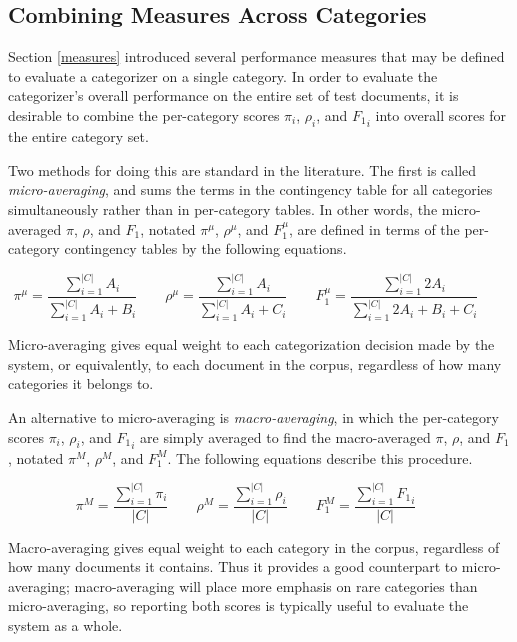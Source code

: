 \subsection{Combining Measures Across Categories}
\label{combining-measures}

Section \ref{measures} introduced several performance measures that
may be defined to evaluate a categorizer on a single category.  In
order to evaluate the categorizer's overall performance on the entire
set of test documents, it is desirable to combine the per-category
scores $\pi_i$, $\rho_i$, and ${F_1}_i$ into overall scores for the
entire category set.

Two methods for doing this are standard in the literature.  The first
is called \emph{micro-averaging}, and sums the terms in the
contingency table for all categories simultaneously rather than in
per-category tables.  In other words, the micro-averaged $\pi$,
$\rho$, and $F_1$, notated $\pi^\mu$, $\rho^\mu$, and $F^\mu_1$, are
defined in terms of the per-category contingency tables by the
following equations.

\begin{equation*}
 \pi^\mu = \frac{\sum_{i=1}^{|C|}{A_i}} {\sum_{i=1}^{|C|}{A_i+B_i}} \qquad
\rho^\mu = \frac{\sum_{i=1}^{|C|}{A_i}} {\sum_{i=1}^{|C|}{A_i+C_i}} \qquad
 F^\mu_1 = \frac{\sum_{i=1}^{|C|}{2 A_i}} {\sum_{i=1}^{|C|}{2 A_i+B_i+C_i}} \qquad
\end{equation*}

Micro-averaging gives equal weight to each categorization decision
made by the system, or equivalently, to each document in the corpus,
regardless of how many categories it belongs to.

An alternative to micro-averaging is \emph{macro-averaging}, in which
the per-category scores $\pi_i$, $\rho_i$, and ${F_1}_i$ are simply
averaged to find the macro-averaged $\pi$, $\rho$, and $F_1$, notated
$\pi^M$, $\rho^M$, and $F^M_1$.  The following equations describe this
procedure.

\begin{equation*}
 \pi^M = \frac{\sum_{i=1}^{|C|}{\pi_i}}   {|C|} \qquad
\rho^M = \frac{\sum_{i=1}^{|C|}{\rho_i}}  {|C|} \qquad
 F^M_1 = \frac{\sum_{i=1}^{|C|}{{F_1}_i}} {|C|} \qquad
\end{equation*}

Macro-averaging gives equal weight to each category in the corpus,
regardless of how many documents it contains.  Thus it provides a
good counterpart to micro-averaging; macro-averaging will place more
emphasis on rare categories than micro-averaging, so reporting both
scores is typically useful to evaluate the system as a whole.

